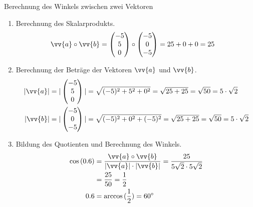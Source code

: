 \begin{bsp}{Berechnung des Winkels zwischen zwei Vektoren}{}
\begin{enumerate}
    \item Berechnung des Skalarprodukts.
    \begin{equation*}
        \begin{split}
            \vv{a} \circ \vv{b} &= \begin{pmatrix} -5 \\5 \\0\end{pmatrix} \circ \begin{pmatrix} -5 \\0 \\-5 \end{pmatrix} = 25 +0 +0 = 25
            \end{split}
            \end{equation*}
    \item Berechnung der Beträge der Vektoren $\vv{a}$ und $\vv{b}$.
    \begin{equation*}
        \begin{split}
            |\vv{a}| & = |\begin{pmatrix} -5 \\5\\0\end{pmatrix}| =  \sqrt{(-5)^2 + 5^2 + 0^2}  = \sqrt{25+25} = \sqrt{50} = 5\cdot \sqrt{2}\\
            |\vv{b}| &= |\begin{pmatrix} -5 \\0\\-5\end{pmatrix} |= \sqrt{(-5)^2 + 0^2 + (-5)^2} = \sqrt{25+25}= \sqrt{50} = 5\cdot \sqrt{2}
            \end{split}
            \end{equation*}
    \item Bildung des Quotienten und Berechnung des Winkels.
    \begin{equation*}
        \begin{split}
            \cos{(\alpha)} &= \dfrac{\vv{a}\circ \vv{b}}{|\vv{a}| \cdot |\vv{b}|}= \dfrac{25}{5\sqrt{2} \cdot 5\sqrt{2}}\\
            &= \dfrac{25}{50} = \dfrac{1}{2}\\
            \alpha &= \arccos{(\dfrac{1}{2})} = 60^{\circ}
            \end{split}
            \end{equation*}
\end{enumerate}
\end{bsp}
